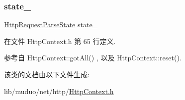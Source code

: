 \subsubsection{\texorpdfstring{state\+\_\+}{state\_}}
{\footnotesize\ttfamily \hyperlink{classmuduo_1_1net_1_1HttpContext_ae45b4b16d3226e885f8f1b01481cdc97}{Http\+Request\+Parse\+State} state\+\_\+\hspace{0.3cm}{\ttfamily [private]}}



在文件 Http\+Context.\+h 第 65 行定义.



参考自 Http\+Context\+::got\+All() , 以及 Http\+Context\+::reset().



该类的文档由以下文件生成\+:\begin{DoxyCompactItemize}
\item 
lib/muduo/net/http/\hyperlink{HttpContext_8h}{Http\+Context.\+h}\end{DoxyCompactItemize}
